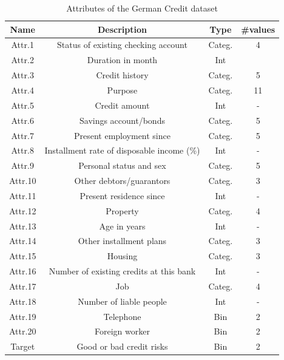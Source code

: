 \begin{table}[ht]
    \centering
     \caption{Attributes of the German Credit dataset}
    \label{tab:german-credit}
    \begin{tabular}{|c|c|c|c|}
    \hline
        Name & Description & Type & \#values \\
    \hline
    \hline
         Attr.1 & Status of existing checking account & Categ. & 4 \\
         \hline
         Attr.2 & Duration in month & Int & \\
         \hline
         Attr.3 & Credit history & Categ. & 5\\
         \hline
         Attr.4 & Purpose & Categ. & 11 \\
         \hline
         Attr.5 & Credit amount & Int & -\\
         \hline
         Attr.6 & Savings account/bonds & Categ. & 5\\
         \hline
         Attr.7 & Present employment since & Categ. & 5\\
         \hline
         Attr.8 & Installment rate of disposable income (\%) & Int & -\\
         \hline
         Attr.9 & Personal status and sex & Categ. & 5 \\
         \hline
         Attr.10 & Other debtors/guarantors & Categ. & 3\\
         \hline
         Attr.11 & Present residence since & Int & -\\
         \hline
         Attr.12 & Property & Categ. & 4\\
         \hline
         Attr.13 & Age in years & Int & -\\
         \hline
         Attr.14 & Other installment plans & Categ. & 3\\
         \hline
         Attr.15 & Housing & Categ. & 3\\
         \hline
         Attr.16 & Number of existing credits at this bank & Int & -\\
         \hline
         Attr.17 & Job & Categ. & 4\\
         \hline
         Attr.18 & Number of liable people & Int & -\\
         \hline
         Attr.19 & Telephone & Bin & 2 \\
         \hline
         Attr.20 & Foreign worker & Bin & 2 \\
         \hline
         Target & Good or bad credit risks & Bin & 2\\
         \hline
    \end{tabular}
\end{table}

